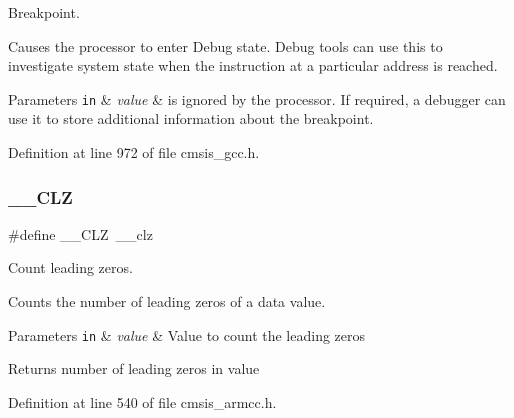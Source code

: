 Breakpoint. 

Causes the processor to enter Debug state. Debug tools can use this to investigate system state when the instruction at a particular address is reached. 
\begin{DoxyParams}[1]{Parameters}
\mbox{\tt in}  & {\em value} & is ignored by the processor. If required, a debugger can use it to store additional information about the breakpoint. \\
\hline
\end{DoxyParams}


Definition at line 972 of file cmsis\+\_\+gcc.\+h.

\mbox{\label{group___c_m_s_i_s___core___instruction_interface_ga5d5bb1527e042be4a9fa5a33f65cc248}} 
\subsubsection{\texorpdfstring{\+\_\+\+\_\+\+C\+LZ}{\_\_CLZ}\hspace{0.1cm}{\footnotesize\ttfamily [1/3]}}
{\footnotesize\ttfamily \#define \+\_\+\+\_\+\+C\+LZ~\+\_\+\+\_\+clz}



Count leading zeros. 

Counts the number of leading zeros of a data value. 
\begin{DoxyParams}[1]{Parameters}
\mbox{\tt in}  & {\em value} & Value to count the leading zeros \\
\hline
\end{DoxyParams}
\begin{DoxyReturn}{Returns}
number of leading zeros in value 
\end{DoxyReturn}


Definition at line 540 of file cmsis\+\_\+armcc.\+h.

\mbox{\label{group___c_m_s_i_s___core___instruction_interface_ga5d5bb1527e042be4a9fa5a33f65cc248}} 
